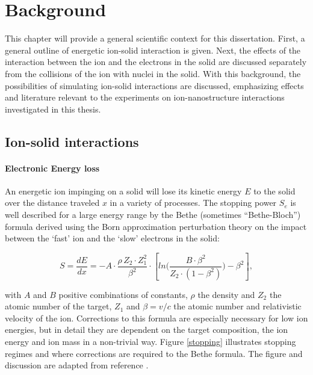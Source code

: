 \chapter{Background}

This chapter will provide a general scientific context for this dissertation. First, a general outline of energetic ion-solid interaction is given. Next, the effects of the interaction between the ion and the electrons in the solid are discussed separately from the collisions of the ion with nuclei in the solid. With this background, the possibilities of simulating ion-solid interactions are discussed, emphasizing effects and literature relevant to the experiments on ion-nanostructure interactions investigated in this thesis. 

\section{Ion-solid interactions}
\label{sec:ionsolid}

\subsubsection{Electronic Energy loss}

An energetic ion impinging on a solid will lose its kinetic energy $E$ to the solid over the distance traveled $x$ in a variety of processes. The stopping power $S_e$ is well described for a large energy range by the Bethe (sometimes ``Bethe-Bloch'') formula \cite{bethe_zur_1930,bloch_zur_1933} derived using the Born approximation perturbation theory on the impact between the `fast' ion and the `slow' electrons in the solid: 

\begin{equation}
S = \frac{dE}{dx} = - A \cdot \frac{\rho\,Z_2\cdot Z_1^2}{\beta^2} \cdot \left[ln\Big(\frac{B\cdot\beta^2}{Z_2\cdot(1-\beta^2)}\Big)-\beta^2\right] ,
\end{equation}


with $A$ and $B$ positive combinations of constants, $\rho$ the density and $Z_2$ the atomic number of the target, $Z_1$ and $\beta = v/c$ the atomic number and relativistic velocity of the ion. Corrections to this formula are especially necessary for low ion energies, but in detail they are dependent on the target composition, the ion energy and ion mass in a non-trivial way. Figure \ref{stopping} illustrates stopping regimes and where corrections are required to the Bethe formula. The figure and discussion are adapted from reference \cite{sigmund_stopping_2004}.

